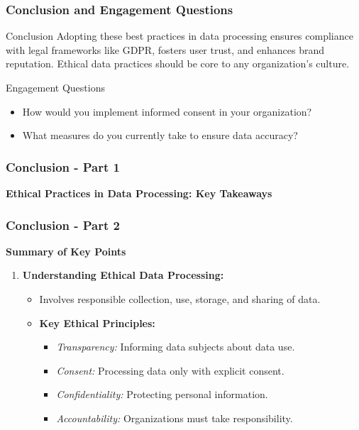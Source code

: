 \documentclass[aspectratio=169]{beamer}
\begin{document}
\begin{frame}[fragile]
    \frametitle{Conclusion and Engagement Questions}
    \begin{block}{Conclusion}
        Adopting these best practices in data processing ensures compliance with legal frameworks like GDPR, fosters user trust, and enhances brand reputation. Ethical data practices should be core to any organization's culture.
    \end{block}
    
    \begin{block}{Engagement Questions}
        \begin{itemize}
            \item How would you implement informed consent in your organization?
            \item What measures do you currently take to ensure data accuracy?
        \end{itemize}
    \end{block}
\end{frame}

\begin{frame}[fragile]
    \frametitle{Conclusion - Part 1}
    \textbf{Ethical Practices in Data Processing: Key Takeaways}
\end{frame}

\begin{frame}[fragile]
    \frametitle{Conclusion - Part 2}
    \textbf{Summary of Key Points}
    \begin{enumerate}
        \item \textbf{Understanding Ethical Data Processing:}
        \begin{itemize}
            \item Involves responsible collection, use, storage, and sharing of data.
            \item \textbf{Key Ethical Principles:}
                \begin{itemize}
                    \item \textit{Transparency:} Informing data subjects about data use.
                    \item \textit{Consent:} Processing data only with explicit consent.
                    \item \textit{Confidentiality:} Protecting personal information.
                    \item \textit{Accountability:} Organizations must take responsibility.
                \end{itemize}
        \end{itemize}
    \end{enumerate}
\end{frame}
\end{document}
